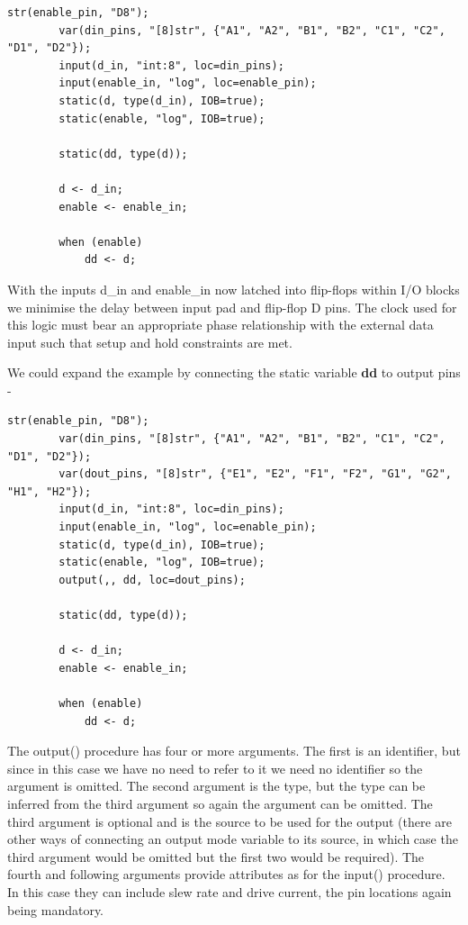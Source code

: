 \documentclass[10pt,a4paper,twoside,fleqn]{article}
\newcommand{\var}[1]{{\bf #1}} %
\begin{document}
    \begin{lstlisting}[language=threepl]
        str(enable_pin, "D8");
        var(din_pins, "[8]str", {"A1", "A2", "B1", "B2", "C1", "C2", "D1", "D2"});
        input(d_in, "int:8", loc=din_pins);
        input(enable_in, "log", loc=enable_pin);
        static(d, type(d_in), IOB=true);
        static(enable, "log", IOB=true);
        
        static(dd, type(d));

        d <- d_in;
        enable <- enable_in;

        when (enable)
            dd <- d;
    \end{lstlisting}
    With the inputs d\_in and enable\_in now latched into flip-flops within I/O blocks
    we minimise the delay between input pad and flip-flop D pins. The clock used for
    this logic must bear an appropriate phase relationship with the external data input
    such that setup and hold constraints are met.
    
    We could expand the example by connecting the static variable {\var{dd}} to output
    pins -
    
    \begin{lstlisting}[language=threepl]
        str(enable_pin, "D8");
        var(din_pins, "[8]str", {"A1", "A2", "B1", "B2", "C1", "C2", "D1", "D2"});
        var(dout_pins, "[8]str", {"E1", "E2", "F1", "F2", "G1", "G2", "H1", "H2"});
        input(d_in, "int:8", loc=din_pins);
        input(enable_in, "log", loc=enable_pin);
        static(d, type(d_in), IOB=true);
        static(enable, "log", IOB=true);
        output(,, dd, loc=dout_pins);
        
        static(dd, type(d));

        d <- d_in;
        enable <- enable_in;

        when (enable)
            dd <- d;
    \end{lstlisting}
        
    The output() procedure has four or more arguments. The first is an identifier,
    but since in this case we have no need to refer to it we need no identifier so
    the argument is omitted. The second argument is the type, but the type can be
    inferred from the third argument so again the argument can be omitted. The
    third argument is optional and is the source to be used for the output (there
    are other ways of connecting an output mode variable to its source, in which
    case the third argument would be omitted but the first two would be required).
    The fourth and following arguments provide attributes as for the input()
    procedure. In this case they can include slew rate and drive current, the pin
    locations again being mandatory.
    
\end{document}
